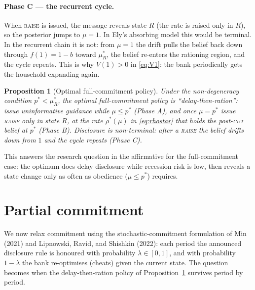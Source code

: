 \documentclass[12pt]{article}
\newtheorem{prop}{Proposition}
\begin{document}
\paragraph{Phase C --- the recurrent cycle.} When \textsc{raise} is issued, the message reveals state $R$ (the rate is raised only in $R$), so the posterior jumps to $\mu = 1$. In Ely's absorbing model this would be terminal. In the recurrent chain it is not: from $\mu=1$ the drift pulls the belief back down through $f(1) = 1-b$ toward $\mu_R^*$, the belief re-enters the rationing region, and the cycle repeats. This is why $V(1)>0$ in \eqref{eq:V1}: the bank periodically gets the household expanding again.

\begin{prop}[Optimal full-commitment policy]\label{prop:optfc}
Under the non-degeneracy condition $p^* < \mu_R^*$, the optimal full-commitment policy is ``delay-then-ration'': issue uninformative guidance while $\mu \le p^*$ (Phase A), and once $\mu = p^*$ issue \textup{\textsc{raise}} only in state $R$, at the rate $\rho^*(\mu)$ in \eqref{eq:rhostar} that holds the post-\textup{\textsc{cut}} belief at $p^*$ (Phase B). Disclosure is non-terminal: after a \textup{\textsc{raise}} the belief drifts down from $1$ and the cycle repeats (Phase C).
\end{prop}

This answers the research question in the affirmative for the full-commitment case: the optimum does delay disclosure while recession risk is low, then reveals a state change only as often as obedience ($\mu \le p^*$) requires.

\section{Partial commitment}\label{Partial}

We now relax commitment using the stochastic-commitment formulation of Min (2021) and Lipnowski, Ravid, and Shishkin (2022): each period the announced disclosure rule is honoured with probability $\lambda \in [0,1]$, and with probability $1-\lambda$ the bank re-optimises (cheats) given the current state. The question becomes when the delay-then-ration policy of Proposition~\ref{prop:optfc} survives period by period.
\end{document}
